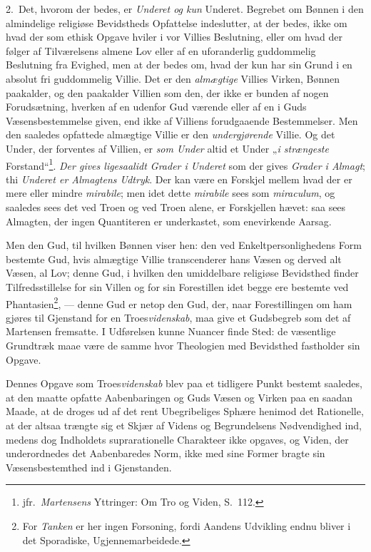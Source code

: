 \documentclass[12pt,a4paper]{book}
\newcommand{\opage}[1]{\marginnote{\footnotesize\textit{[#1]}}}
\begin{document}
2.\ Det, hvorom der bedes, er \emph{Underet og kun} Underet. Begrebet om Bønnen i den
almindelige religiøse Bevidstheds Opfattelse indeslutter, at der bedes, ikke om hvad der
som ethisk Opgave hviler i vor Villies Beslutning, eller om hvad der følger af
Tilværelsens almene Lov eller af en uforanderlig guddommelig Beslutning fra Evighed, men
at der bedes om, hvad der kun har sin Grund i en absolut fri guddommelig Villie. Det er den \emph{almægtige} Villies Virken, Bønnen paakalder, og den paakalder Villien som den, der ikke
er bunden af nogen Forudsætning, hverken af en udenfor Gud værende eller af en i Guds
Væsensbestemmelse given, end ikke af Villiens forudgaaende Bestemmelser. Men den saaledes
opfattede almægtige Villie er den \emph{undergjørende} Villie. Og det Under, der forventes af
Villien, er \emph{som Under} altid et Under „\emph{i strængeste} Forstand“\footnote{jfr.\ \emph{Martensens} Yttringer: Om Tro og Viden, S.\ 112.}. \emph{Der gives ligesaalidt Grader i Underet} som der gives \emph{Grader i Almagt}; thi \emph{Underet er Almagtens Udtryk}. Der kan være en
Forskjel mellem hvad der er mere eller mindre \emph{\textit{mirabile}}; men idet dette
\textit{mirabile} sees som \emph{\textit{miraculum}}, og saaledes sees det ved Troen og ved Troen
alene, er Forskjellen hævet: \opage{98}saa sees Almagten, der ingen Quantiteren er underkastet, som
enevirkende Aarsag.

Men den Gud, til hvilken Bønnen viser hen: den ved Enkeltpersonlighedens Form bestemte
Gud, hvis almægtige Villie transcenderer hans Væsen og derved alt Væsen, al Lov; denne
Gud, i hvilken den umiddelbare religiøse Bevidsthed finder Tilfredsstillelse for sin
Villen og for sin Forestillen idet begge ere bestemte ved Phantasien\footnote{For \emph{Tanken} er her ingen Forsoning, fordi Aandens Udvikling endnu bliver i det Sporadiske,
Ugjennemarbeidede.}, --- denne Gud er netop den Gud, der, naar Forestillingen om ham
gjøres til Gjenstand for en Troes\emph{videnskab}, maa give et Gudsbegreb som det af Martensen
fremsatte. I Udførelsen kunne Nuancer finde Sted: de væsentlige Grundtræk maae være de
samme hvor Theologien med Bevidsthed fastholder sin Opgave.

Dennes Opgave som Troes\emph{videnskab} blev paa et tidligere Punkt bestemt saaledes, at den
maatte opfatte Aabenbaringen og Guds Væsen og Virken paa en saadan Maade, at de droges ud
af det rent Ubegribeliges Sphære henimod det Rationelle, at der altsaa trængte sig et
Skjær af Videns og Begrundelsens Nødvendighed ind, medens dog Indholdets suprarationelle
Charakteer ikke opgaves, og Viden, der underordnedes det Aabenbaredes Norm, ikke med sine
Former bragte sin Væsensbestemthed ind i Gjenstanden.
\end{document}
